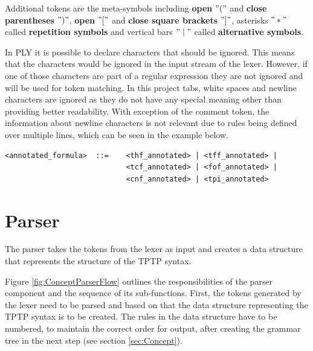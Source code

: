 Additional tokens are the meta-symbols including \textbf{open} $"("$ and \textbf{close parentheses} $")"$, \textbf{open} $"["$ and \textbf{close square brackets} $"]"$, asterisks $"*"$ called \textbf{repetition symbols} and vertical bars $"\mid"$ called \textbf{alternative symbols}.

In PLY it is possible to declare characters that should be ignored. This means that the characters would be ignored in the input stream of the lexer. However, if one of those characters are part of a regular expression they are not ignored and will be used for token matching. In this project tabs, white spaces and newline characters are ignored as they do not have any special meaning other than providing better readability. With exception of the comment token, the information about newline characters is not relevant due to rules being defined over multiple lines, which can be seen in the example below.
\begin{verbatim}
<annotated_formula>  ::=    <thf_annotated> | <tff_annotated> |
                            <tcf_annotated> | <fof_annotated> |
                            <cnf_annotated> | <tpi_annotated>
\end{verbatim}


\section{Parser}\label{sec:ConceptParser}
The parser takes the tokens from the lexer as input and creates a data structure that represents the structure of the \ac{TPTP} syntax.

Figure \ref{fig:ConceptParserFlow} outlines the responsibilities of the parser component and the sequence of its sub-functions.
First, the tokens generated by the lexer need to be parsed and based on that the data structure representing the \ac{TPTP} syntax is to be created.
The rules in the data structure have to be numbered, to maintain the correct order for output, after creating the grammar tree in the next step (see section \ref{sec:Concept}).

